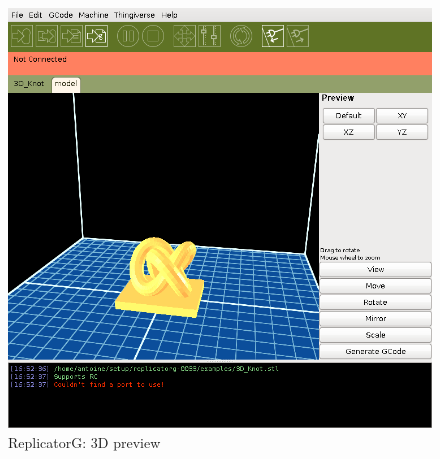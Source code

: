 \documentclass{article}
\begin{document}
	\begin{figure}[h!]
		\centering
		\includegraphics[width=0.5\linewidth]{replicatorg.png}
		\caption{ReplicatorG: 3D preview}
	\end{figure}
\end{document}
